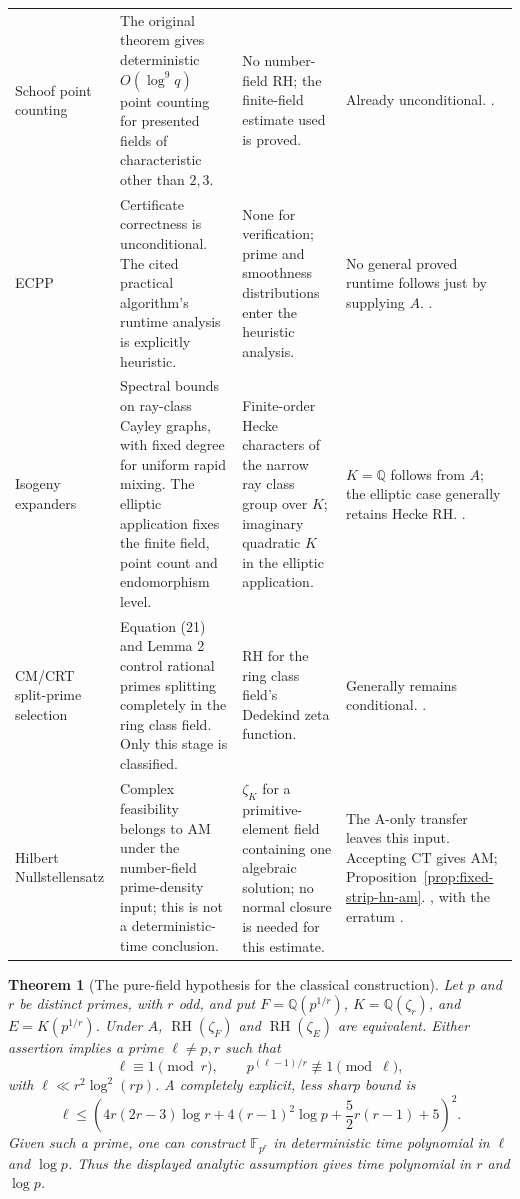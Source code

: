 \documentclass[11pt]{article}
\newcommand{\Q}{\mathbb Q}
\newcommand{\F}{\mathbb F}
\newcommand{\RH}{\operatorname{RH}}
\newtheorem{theorem}{Theorem}[section]
\theoremstyle{definition}
\theoremstyle{remark}
\begin{document}
\begin{longtable}{@{}p{}p{}p{}p{}@{}}
Schoof point counting & The original theorem gives deterministic $O(\log^9q)$ point counting for presented fields of characteristic other than $2,3$. & No number-field RH; the finite-field estimate used is proved. & Already unconditional. \citet[pp.~483, 485--490]{Schoof1985}. \\
ECPP & Certificate correctness is unconditional. The cited practical algorithm's runtime analysis is explicitly heuristic. & None for verification; prime and smoothness distributions enter the heuristic analysis. & No general proved runtime follows just by supplying $A$. \citet[Thm.~5.2, p.~121; pp.~122, 124--125]{Schoof2008}. \\
Isogeny expanders & Spectral bounds on ray-class Cayley graphs, with fixed degree for uniform rapid mixing. The elliptic application fixes the finite field, point count and endomorphism level. & Finite-order Hecke characters of the narrow ray class group over $K$; imaginary quadratic $K$ in the elliptic application. & $K=\Q$ follows from $A$; the elliptic case generally retains Hecke RH. \citet[Thms.~1.1, 1.5--1.6; proof p.~9]{JMV2009}. \\
CM/CRT split-prime selection & Equation (21) and Lemma 2 control rational primes splitting completely in the ring class field. Only this stage is classified. & RH for the ring class field's Dedekind zeta function. & Generally remains conditional. \citet[corrected author pp.~21--22]{Sutherland2011}. \\
Hilbert Nullstellensatz & Complex feasibility belongs to $\mathrm{AM}$ under the number-field prime-density input; this is not a deterministic-time conclusion. & $\zeta_K$ for a primitive-element field containing one algebraic solution; no normal closure is needed for this estimate. & The A-only transfer leaves this input. Accepting $\mathrm{CT}$ gives AM; Proposition~\ref{prop:fixed-strip-hn-am}. \citet[Thm.~9, p.~282]{Koiran1996}, with the erratum \citep{KoiranErratum1997}. \\
\end{longtable}
\endgroup


\begin{theorem}[The pure-field hypothesis for the classical construction]
\label{thm:kummer}
Let $p$ and $r$ be distinct primes, with $r$ odd, and put
$F=\Q(p^{1/r})$, $K=\Q(\zeta_r)$, and $E=K(p^{1/r})$.
Under $A$, $\RH(\zeta_F)$ and $\RH(\zeta_E)$ are equivalent.
Either assertion implies a prime $\ell\ne p,r$ such that
\[
 \ell\equiv1\pmod r,\qquad p^{(\ell-1)/r}\not\equiv1\pmod\ell,
\]
with $\ell\ll r^2\log^2(rp)$. A completely explicit, less sharp
bound is
\begin{equation}\label{eq:bound}
 \ell\le \left(4r(2r-3)\log r+4(r-1)^2\log p
             +\frac52r(r-1)+5\right)^2.
\end{equation}
Given such a prime, one can construct $\F_{p^r}$ in deterministic time
polynomial in $\ell$ and $\log p$.  Thus the displayed analytic assumption
gives time polynomial in $r$ and $\log p$.
\end{theorem}
\end{document}
